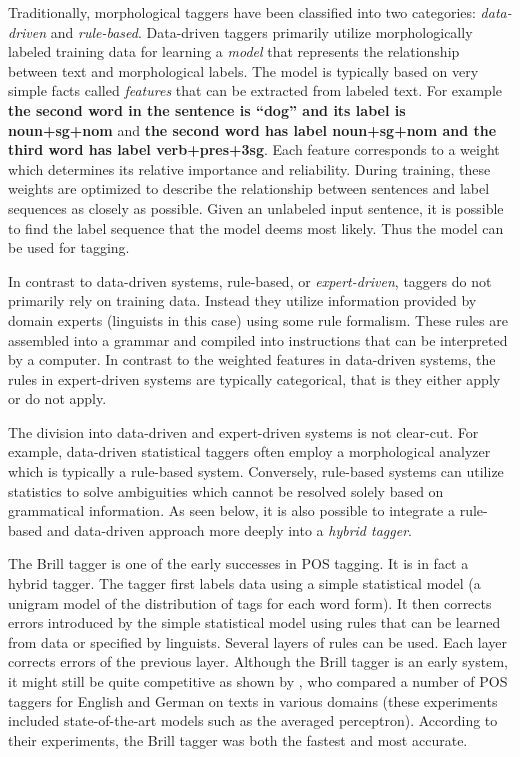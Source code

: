 Traditionally, morphological taggers have been classified into two
categories: {\it data-driven} and {\it rule-based}. Data-driven
taggers primarily utilize morphologically labeled training data for
learning a {\it model} that represents the relationship between text
and morphological labels. The model is typically based on very simple
facts called {\it features} that can be extracted from labeled
text. For example {\bf the second word in the sentence is ``dog'' and
  its label is noun+sg+nom} and {\bf the second word has label
  noun+sg+nom and the third word has label verb+pres+3sg}. Each
feature corresponds to a weight which determines its relative
importance and reliability. During training, these weights are
optimized to describe the relationship between sentences and label
sequences as closely as possible. Given an unlabeled input sentence,
it is possible to find the label sequence that the model deems most
likely. Thus the model can be used for tagging.

In contrast to data-driven systems, rule-based, or {\it
  expert-driven}, taggers do not primarily rely on training
data. Instead they utilize information provided by domain experts
(linguists in this case) using some rule formalism. These rules are
assembled into a grammar and compiled into instructions that can be
interpreted by a computer. In contrast to the weighted features in
data-driven systems, the rules in expert-driven systems are typically
categorical, that is they either apply or do not apply. 

The division into data-driven and expert-driven systems is not
clear-cut. For example, data-driven statistical taggers often employ a
morphological analyzer which is typically a rule-based
system. Conversely, rule-based systems can utilize statistics to solve
ambiguities which cannot be resolved solely based on grammatical
information. As seen below, it is also possible to integrate a
rule-based and data-driven approach more deeply into a {\it hybrid
  tagger}.

The Brill tagger \citep{Brill1992} is one of the early successes in
POS tagging. It is in fact a hybrid tagger. The tagger first labels
data using a simple statistical model (a unigram model of the
distribution of tags for each word form). It then corrects errors
introduced by the simple statistical model using rules that can be
learned from data or specified by linguists. Several layers of rules
can be used. Each layer corrects errors of the previous
layer. Although the Brill tagger is an early system, it might still be
quite competitive as shown by \cite{Horsmann2015}, who compared a
number of POS taggers for English and German on texts in various
domains (these experiments included state-of-the-art models such as
the averaged perceptron). According to their experiments, the Brill
tagger was both the fastest and most accurate.

